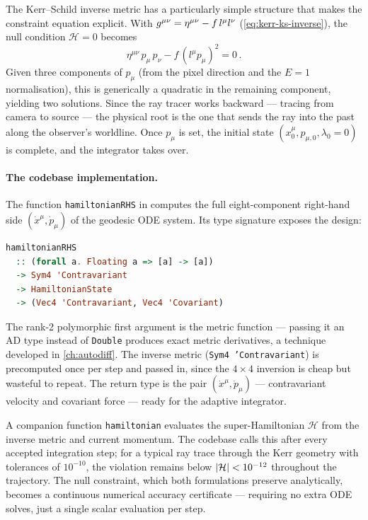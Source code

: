 The Kerr--Schild inverse metric has a particularly simple structure that
makes the constraint equation explicit.  With
$g^{\mu\nu} = \eta^{\mu\nu} - f\,l^\mu l^\nu$
(\cref{eq:kerr-ks-inverse}), the null condition $\mathcal{H} = 0$ becomes
%
\begin{equation}
  \eta^{\mu\nu}\,p_\mu\,p_\nu - f\,(l^\mu p_\mu)^2 = 0 \,.
  \label{eq:null-constraint-ks}
\end{equation}
%
Given three components of $p_\mu$ (from the pixel direction and the
$E = 1$ normalisation), this is generically a quadratic in the remaining
component, yielding two solutions.  Since the ray tracer works backward
--- tracing from camera to source --- the physical root is the one that
sends the ray into the past along the observer's worldline.  Once $p_\mu$
is set, the initial state $(x^\mu_0, p_{\mu,0}, \lambda_0 = 0)$ is
complete, and the integrator takes over.

\paragraph{The codebase implementation.}

The function \texttt{hamiltonianRHS} in
 computes the full eight-component
right-hand side $(\dot{x}^\mu, \dot{p}_\mu)$ of the geodesic ODE system.
Its type signature exposes the design:
%
\begin{lstlisting}[language=Haskell]
hamiltonianRHS
  :: (forall a. Floating a => [a] -> [a])
  -> Sym4 'Contravariant
  -> HamiltonianState
  -> (Vec4 'Contravariant, Vec4 'Covariant)
\end{lstlisting}
%
The rank-2 polymorphic first argument is the metric function --- passing
it an AD type instead of \texttt{Double} produces exact metric
derivatives, a technique developed in \cref{ch:autodiff}.  The inverse
metric (\texttt{Sym4 'Contravariant}) is precomputed once per step and
passed in, since the $4 \times 4$ inversion is cheap but wasteful to
repeat.  The return type is the pair $(\dot{x}^\mu, \dot{p}_\mu)$ ---
contravariant velocity and covariant force --- ready for the adaptive
integrator.

A companion function \texttt{hamiltonian} evaluates the
super-Hamiltonian $\mathcal{H}$ from the inverse metric and current
momentum.  The codebase calls this after
every accepted integration step; for a typical ray trace through the Kerr
geometry with tolerances of $10^{-10}$, the violation remains below
$\left\lvert \mathcal{H} \right\rvert < 10^{-12}$ throughout the trajectory.  The null
constraint, which both formulations preserve analytically, becomes a
continuous numerical accuracy certificate --- requiring no extra ODE
solves, just a single scalar evaluation per step.
